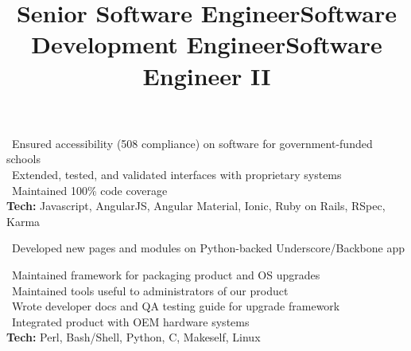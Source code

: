         \title{Senior Software Engineer}
        \begin{position}
			\textbullet \ Ensured accessibility (508 compliance) on software for government-funded schools\\
			\textbullet \ Extended, tested, and validated interfaces with proprietary systems\\
			\textbullet \ Maintained 100\% code coverage\\
			\textbf{Tech:} Javascript, AngularJS, Angular Material, Ionic, Ruby on Rails, RSpec, Karma
        \end{position}


        \title{Software Development Engineer}
        \begin{position}
			\textbullet \ Developed new pages and modules on Python-backed Underscore/Backbone app
        \end{position}


        \title{Software Engineer II}
        \begin{position}
			\textbullet \ Maintained framework for packaging product and OS upgrades \\
			\textbullet \ Maintained tools useful to administrators of our product \\
			\textbullet \ Wrote developer docs and QA testing guide for upgrade framework\\
			\textbullet \ Integrated product with OEM hardware systems\\
			\textbf{Tech:} Perl, Bash/Shell, Python, C, Makeself, Linux
        \end{position}
        
